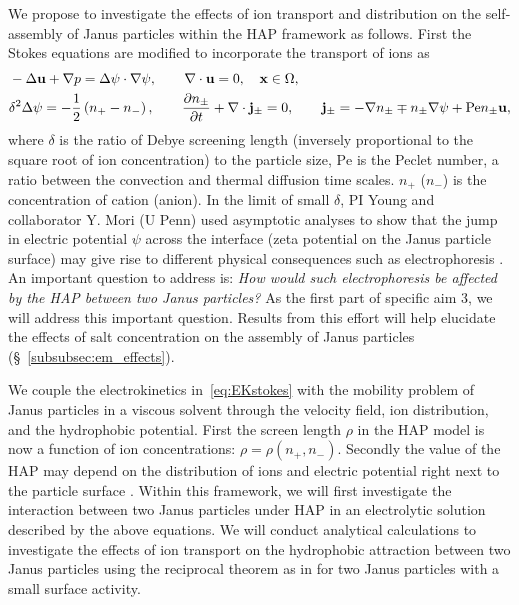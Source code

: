 We propose to investigate the effects of ion transport and distribution on the self-assembly of Janus particles within the HAP framework as follows.
First the Stokes equations are modified to incorporate the transport of ions as
\begin{equation}
\label{eq:EKstokes}
\begin{aligned}
  &-\Delta \mathbf{u} + \nabla p = \Delta\psi\cdot\nabla\psi, \qquad
  \nabla \cdot \mathbf{u} = 0,  \quad \mathbf{x} \in \Omega,\\
  &\delta^2\Delta\psi = -\frac{1}{2}\left(n_+-n_-\right),\qquad
  \frac{\partial n_{\pm}}{\partial t} + \nabla\cdot{\bf j}_{\pm} = 0,\qquad {\bf j}_{\pm} = -\nabla n_{\pm} \mp n_{\pm} \nabla\psi + \mbox{Pe} n_{\pm}\mathbf{u},
\end{aligned}
\end{equation}
where $\delta$ is the ratio of Debye screening length (inversely proportional to the square root of
ion concentration) to the particle size, 
$\mbox{Pe}$ is the Peclet number, a ratio between the convection and  thermal diffusion time scales.
$n_{+}$ ($n_{-}$) is the concentration of cation (anion).  In the limit of small $\delta$, PI Young and collaborator Y. Mori (U Penn) used asymptotic analyses to show that the jump in electric potential $\psi$ across the interface (zeta potential on the Janus particle surface) 
may give rise to different physical consequences such as electrophoresis \cite{Mori2018_JFM}.
%
An important question to address is: {\it How would such electrophoresis be affected by the HAP between two Janus particles?} 
As the first part of specific aim 3, we will address this important question. Results from this effort will help elucidate the effects of salt concentration on the assembly of Janus particles (\S~\ref{subsubsec:em_effects}).

We couple the electrokinetics in~\eqref{eq:EKstokes} with the mobility  problem of Janus particles in a viscous solvent through the velocity field, ion distribution, and the hydrophobic potential.  
First the screen length $\rho$ in the HAP model is now a function of ion concentrations: $\rho = \rho(n_+,n_-)$. 
%
Secondly the value of the HAP may depend on the distribution of ions and electric potential right next to the particle surface \cite{Mori2018_JFM}.
Within this framework, we will first investigate the interaction between two Janus particles under HAP in an electrolytic solution described by the above
equations. We will conduct analytical calculations to investigate the effects of ion transport on the hydrophobic attraction between two Janus particles using the reciprocal theorem as in \cite{BayatiNajafi2016_JCP} for two Janus particles with a small surface activity.



